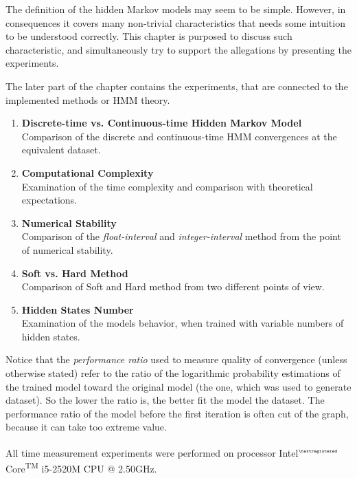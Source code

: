 \documentclass[thesis=M,english]{FITthesis}[2012/10/20]
\begin{document}
The definition of the hidden Markov models may seem to be simple. However, in consequences it covers many non-trivial characteristics that needs some intuition to be understood correctly. This chapter is purposed to discuss such characteristic, and simultaneously try to support the allegations by presenting the experiments.

The later part of the chapter contains the experiments, that are connected to the implemented methods or HMM theory. %

\begin{enumerate}[resume]
\setcounter{enumi}{0}
\item \textbf{Discrete-time vs. Continuous-time Hidden Markov Model} \\
Comparison of the discrete and continuous-time HMM convergences at the equivalent dataset.
\item \textbf{Computational Complexity} \\
Examination of the time complexity and comparison with theoretical expectations.
\item \textbf{Numerical Stability} \\
Comparison of the \textit{float-interval} and \textit{integer-interval} method from the point of numerical stability.
\item \textbf{Soft vs. Hard Method}\\
Comparison of Soft and Hard method from two different points of view.
\item \textbf{Hidden States Number} \\
Examination of the models behavior, when trained with variable numbers of hidden states.

\end{enumerate}

Notice that the \textit{performance ratio} used to measure quality of convergence (unless otherwise stated) refer to the ratio of the logarithmic probability estimations of the trained model toward the original model (the one, which was used to generate dataset). So the lower the ratio is, the better fit the model the dataset. The performance ratio of the model before the first iteration is often cut of the graph, because it can take too extreme value.

All time measurement experiments were performed on processor \textmd{ Intel\textsuperscript{$\tiny{\textregistered}$} Core\textsuperscript{TM} i5-2520M CPU @ 2.50GHz}.
\end{document}
